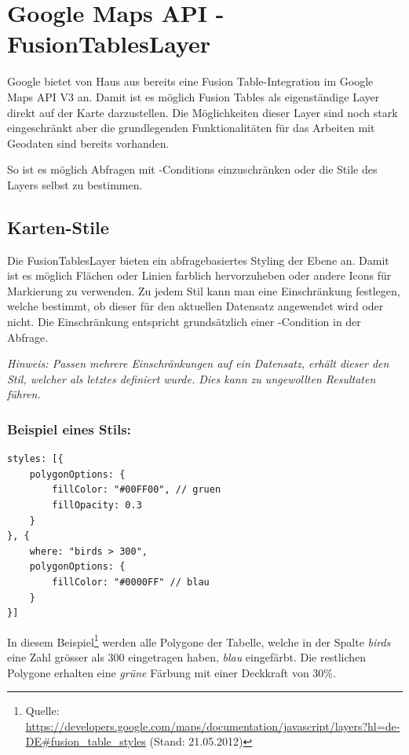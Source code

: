 \section{Google Maps API - FusionTablesLayer}
\label{gmap-api-fusiontableslayer}
Google bietet von Haus aus bereits eine Fusion Table-Integration im Google Maps API V3 an. Damit ist es möglich Fusion Tables als eigenständige Layer direkt auf der Karte darzustellen.
Die Möglichkeiten dieser Layer sind noch stark eingeschränkt aber die grundlegenden Funktionalitäten für das Arbeiten mit Geodaten sind bereits vorhanden.

So ist es möglich Abfragen mit -Conditions einzuschränken oder die Stile des Layers selbst zu bestimmen.

\subsection{Karten-Stile}
\label{fusiontableslayer-styles}
Die FusionTablesLayer bieten ein abfragebasiertes Styling der Ebene an. Damit ist es möglich Flächen oder Linien farblich hervorzuheben oder andere Icons für Markierung zu verwenden. Zu jedem Stil kann man eine Einschränkung festlegen, welche bestimmt, ob dieser für den aktuellen Datensatz angewendet wird oder nicht. Die Einschränkung entspricht grundsätzlich einer -Condition in der Abfrage.

\emph{Hinweis: Passen mehrere Einschränkungen auf ein Datensatz, erhält dieser den Stil, welcher als letztes definiert wurde. Dies kann zu ungewollten Resultaten führen.}

\subsubsection{Beispiel eines Stils:}
\lstset{language=JavaScript}
\begin{lstlisting}[caption=Beispiel eines FusionTablesLayer-Stylings, label=fusiontableslayers-styles-example]
styles: [{
	polygonOptions: {
		fillColor: "#00FF00", // gruen
		fillOpacity: 0.3
	}
}, {
	where: "birds > 300",
	polygonOptions: {
		fillColor: "#0000FF" // blau
	}
}]
\end{lstlisting}

In diesem Beispiel\footnote{Quelle: \url{https://developers.google.com/maps/documentation/javascript/layers?hl=de-DE\#fusion_table_styles} (Stand: 21.05.2012)} werden alle Polygone der Tabelle, welche in der Spalte \emph{birds} eine Zahl grösser als 300 eingetragen haben, \emph{blau} eingefärbt. Die restlichen Polygone erhalten eine \emph{grüne} Färbung mit einer Deckkraft von 30\%.

